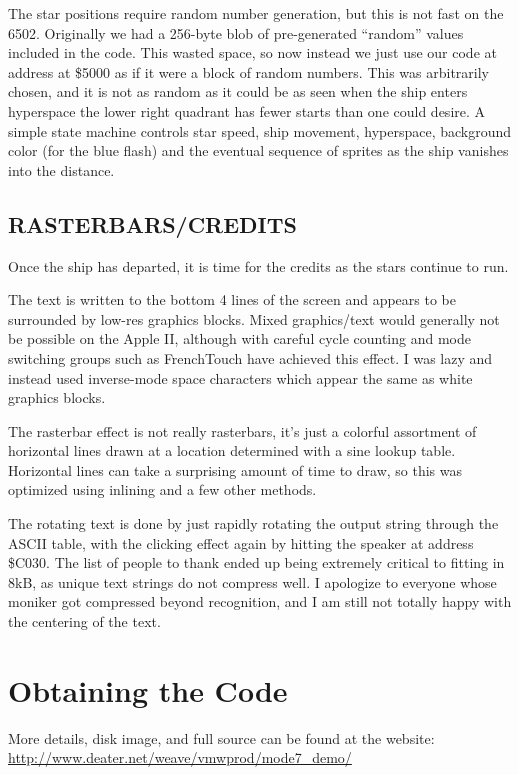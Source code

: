 \documentclass[twocolumn]{article}
\begin{document}
The star positions require random number generation, but this is not
fast on the 6502.
Originally we had a 256-byte blob of pre-generated ``random'' values
included in the code.
This wasted space, so now instead we just use our code at address
at \$5000 as if it were a block of random numbers.
This was arbitrarily chosen, and it is not as random as it could be
as seen when the ship enters hyperspace the lower right quadrant has fewer
starts than one could desire.
A simple state machine controls star speed, ship movement, hyperspace,
background color (for the blue flash) and the eventual sequence of sprites
as the ship vanishes into the distance.

\subsection{RASTERBARS/CREDITS}

Once the ship has departed, it is time for the credits as the stars
continue to run.

The text is written to the bottom 4 lines of the screen and appears
to be surrounded by low-res graphics blocks.
Mixed graphics/text would generally not be possible on the Apple II, although
with careful cycle counting and mode switching groups such as FrenchTouch
have achieved this effect.
I was lazy and instead used inverse-mode space characters which appear the same
as white graphics blocks.

The rasterbar effect is not really rasterbars, it's just a colorful assortment
of horizontal lines drawn at a location determined with a sine lookup table.
Horizontal lines can take a surprising amount of time to draw, so this
was optimized using inlining and a few other methods.

The rotating text is done by just rapidly rotating the output string through
the ASCII table, with the clicking effect again by hitting the speaker
at address \$C030.
The list of people to thank ended up being extremely critical to fitting in 8kB,
as unique text strings do not compress well.  
I apologize to everyone whose moniker got compressed beyond recognition,
and I am still not totally happy with the centering of the text.

\section{Obtaining the Code}

More details, disk image, and full source can be found at the website:
\url{http://www.deater.net/weave/vmwprod/mode7_demo/}
\end{document}
